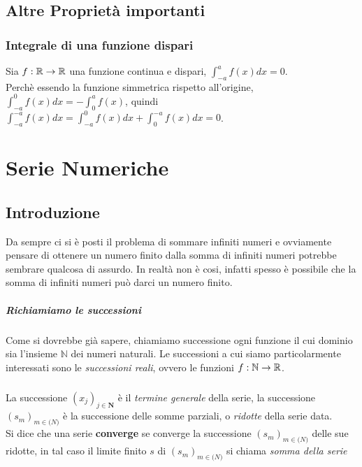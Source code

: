 \documentclass[12pt, a4paper, openany]{book}
\begin{document}
	\section{Altre Proprietà importanti}
	\subsection*{Integrale di una funzione dispari}
	Sia $f : \mathbb{R} \to \mathbb{R}$ una funzione continua e dispari,  $\int_{-a}^{a} f(x) dx = 0$.\\
	Perchè essendo la funzione simmetrica rispetto all'origine, $\int_{-a}^{0} f(x) dx = - \int_{0}^{a} f(x)$, quindi
	$\int_{-a}^{-a} f(x) dx = \int_{-a}^{0} f(x) dx + \int_{0}^{-a} f(x) dx = 0$.

	\chapter{Serie Numeriche}
	\section{Introduzione}
	Da sempre ci si è posti il problema di sommare infiniti numeri e ovviamente pensare di ottenere un numero finito dalla somma di infiniti numeri potrebbe sembrare qualcosa di assurdo.
	In realtà non è cosi, infatti spesso è possibile che la somma di infiniti numeri può darci un numero finito.

	\paragraph*{Richiamiamo le successioni}
	Come si dovrebbe già sapere, chiamiamo successione ogni funzione il cui dominio sia l'insieme $\mathbb{N}$ dei numeri naturali.
	Le successioni a cui siamo particolarmente interessati sono le \emph{successioni reali}, ovvero le funzioni $f : \mathbb{N} \rightarrow \mathbb{R}$.
	\paragraph*{}La successione $(x_j)_{j\in \mathbf{N}}$ è il \emph{termine generale} della serie, la successione $(s_m)_{m\in \mathbf(N)}$ è la successione delle somme parziali, o \emph{ridotte} della serie data.\\
	Si dice che una serie \textbf{converge} se converge la successione $(s_m)_{m\in \mathbf(N)}$ delle sue ridotte, in tal caso il limite finito $s$ di $(s_m)_{m\in \mathbf(N)}$ si chiama \emph{somma della serie}
\end{document}
